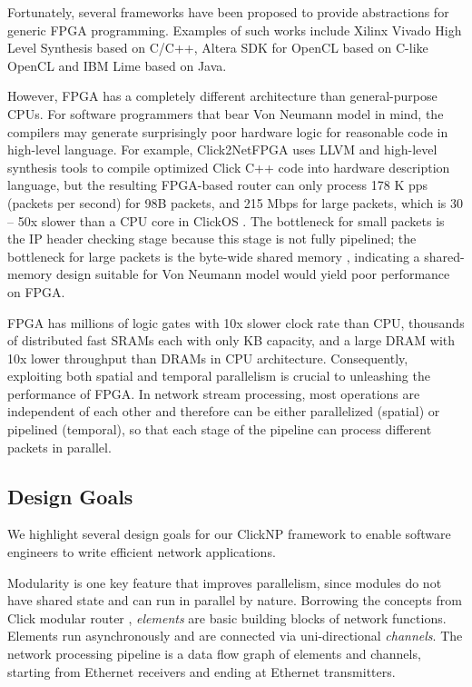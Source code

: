 Fortunately, several frameworks have been proposed to provide abstractions for generic FPGA programming. Examples of such works include Xilinx Vivado High Level Synthesis \cite{feist2012vivado} based on C/C++, Altera SDK for OpenCL \cite{czajkowski2012opencl} based on C-like OpenCL and IBM Lime \cite{auerbach2010lime} based on Java.

However, FPGA has a completely different architecture than general-purpose CPUs. For software programmers that bear Von Neumann model in mind, the compilers may generate surprisingly poor hardware logic for reasonable code in high-level language. For example, Click2NetFPGA \cite{Click2NetFPGA} uses LLVM and high-level synthesis tools to compile optimized Click C++ code into hardware description language, but the resulting FPGA-based router can only process 178 K pps (packets per second) for 98B packets, and 215 Mbps for large packets, which is 30 -- 50x slower than a CPU core in ClickOS \cite{martins2014clickos}. The bottleneck for small packets is the IP header checking stage \cite{Click2NetFPGA} because this stage is not fully pipelined; the bottleneck for large packets is the byte-wide shared memory \cite{Click2NetFPGA}, indicating a shared-memory design suitable for Von Neumann model would yield poor performance on FPGA.

FPGA has millions of logic gates with 10x slower clock rate than CPU, thousands of distributed fast SRAMs each with only KB capacity, and a large DRAM with 10x lower throughput than DRAMs in CPU architecture. Consequently, exploiting both spatial and temporal parallelism is crucial to unleashing the performance of FPGA. In network stream processing, most operations are independent of each other and therefore can be either parallelized (spatial) or pipelined (temporal), so that each stage of the pipeline can process different packets in parallel.

\subsection{Design Goals}
\label{clicknp:subsec:designgoals}

We highlight several design goals for our ClickNP framework to enable software engineers to write efficient network applications.

 Modularity is one key feature that improves parallelism, since modules do not have shared state and can run in parallel by nature. Borrowing the concepts from Click modular router \cite{kohler2000click}, \textit{elements} are basic building blocks of network functions. Elements run asynchronously and are connected via uni-directional \textit{channels}. The network processing pipeline is a data flow graph of elements and channels, starting from Ethernet receivers and ending at Ethernet transmitters.

